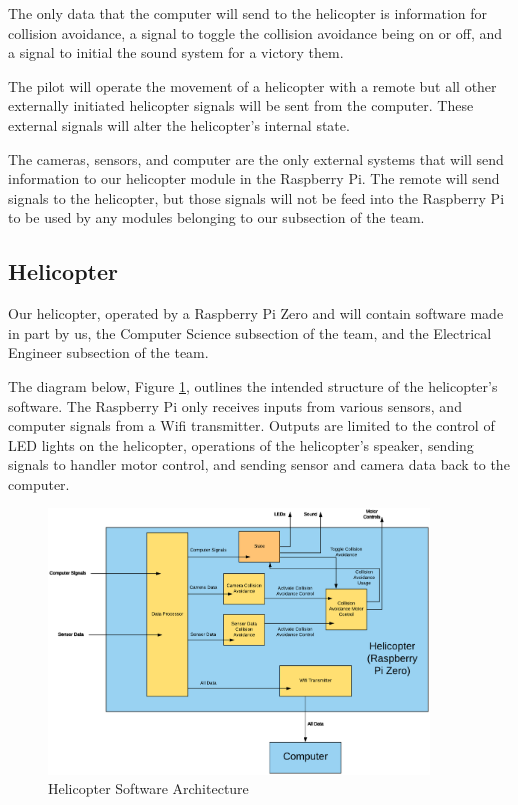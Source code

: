 \documentclass[onecolumn, draftclsnofoot, 10pt, compsoc]{IEEEtran}
\begin{document}
The only data that the computer will send to the helicopter is information for collision avoidance, a signal to toggle the collision avoidance being on or off, and a signal to initial the sound system for a victory them.

The pilot will operate the movement of a helicopter with a remote but all other externally initiated helicopter signals will be sent from the computer. These external signals will alter the helicopter's internal state.

The cameras, sensors, and computer are the only external systems that will send information to our helicopter module in the Raspberry Pi. The remote will send signals to the helicopter, but those signals will not be feed into the Raspberry Pi to be used by any modules belonging to our subsection of the team.

\subsection{Helicopter}
Our helicopter, operated by a Raspberry Pi Zero and will contain software made in part by us, the Computer Science subsection of the team, and the Electrical Engineer subsection of the team.

The diagram below, Figure \ref{fig:HelicopterSoftwareArchitecture}, outlines the intended structure of the helicopter's software. The Raspberry Pi only receives inputs from various sensors, and computer signals from a Wifi transmitter. Outputs are limited to the control of LED lights on the helicopter, operations of the helicopter's speaker, sending signals to handler motor control, and sending sensor and camera data back to the computer.

\begin{figure}[h]
    \centering
    \includegraphics[width=0.9\textwidth]{graphics/helicopter_diagram.eps}
    \caption{Helicopter Software Architecture}
    \label{fig:HelicopterSoftwareArchitecture}
\end{figure}
\end{document}
